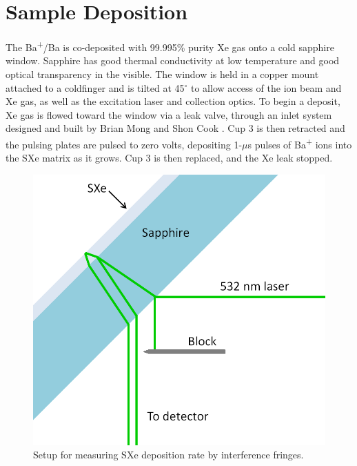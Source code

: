 
\section{Sample Deposition}
\label{sec:deposition}

The Ba\textsuperscript{+}/Ba is co-deposited with 99.995\% purity Xe gas onto a cold sapphire window.  Sapphire has good thermal conductivity at low temperature and good optical transparency in the visible.  The window is held in a copper mount attached to a coldfinger and is tilted at 45$^{\circ}$ to allow access of the ion beam and Xe gas, as well as the excitation laser and collection optics.  To begin a deposit, Xe gas is flowed toward the window via a leak valve, through an inlet system designed and built by Brian Mong and Shon Cook \cite{Brian,Shon}.  Cup 3 is then retracted and the pulsing plates are pulsed to zero volts, depositing 1-$\mu$s pulses of Ba\textsuperscript{+} ions into the SXe matrix as it grows.  Cup 3 is then replaced, and the Xe leak stopped.

\begin{figure} %
        \centering
                \includegraphics[width=.4\textwidth]{figures/fringe_setup.png}
                \caption{Setup for measuring SXe deposition rate by interference fringes.}
\label{fig:fringe_setup}
\end{figure}

